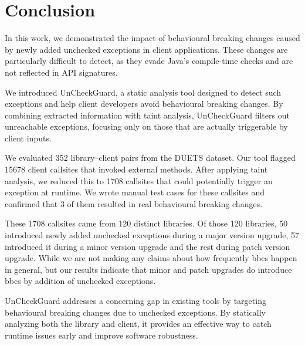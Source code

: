 \chapter{Conclusion}
In this work, we demonstrated the impact of behavioural breaking changes caused by newly added unchecked exceptions in client applications. These changes are particularly difficult to detect, as they evade Java's compile-time checks and are not reflected in API signatures.

We introduced UnCheckGuard, a static analysis tool designed to detect such exceptions and help client developers avoid behavioural breaking changes. By combining extracted information with taint analysis, UnCheckGuard filters out unreachable exceptions, focusing only on those that are actually triggerable by client inputs.

We evaluated 352 library–client pairs from the DUETS dataset. Our tool flagged 15678 client callsites that invoked external methods. After applying taint analysis, we reduced this to 1708 callsites that could potentially trigger an exception at runtime. We wrote manual test cases for these callsites and confirmed that 3 of them resulted in real behavioural breaking changes.

These 1708 callsites came from 120 distinct libraries. Of those 120 libraries, 50 introduced newly added unchecked exceptions during a major version upgrade, 57 introduced it during a minor version upgrade and the rest during patch version upgrade. While we are not making any claims about how frequently \glspl{bbc} happen in general, but our results indicate that minor and patch upgrades do introduce \glspl{bbc} by addition of unchecked exceptions.

UnCheckGuard addresses a concerning gap in existing tools by targeting behavioural breaking changes due to unchecked exceptions. By statically analyzing both the library and client, it provides an effective way to catch runtime issues early and improve software robustness.

